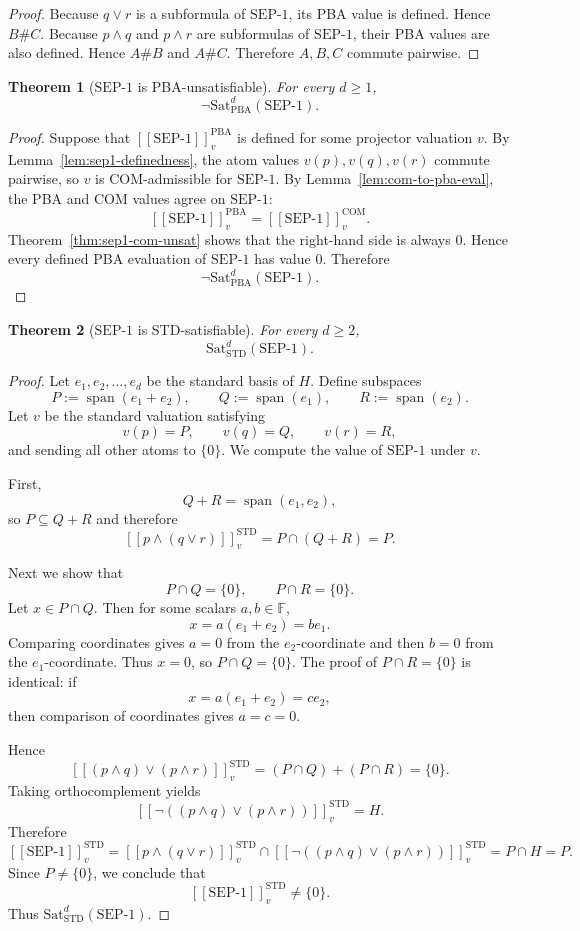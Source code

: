 \documentclass[11pt]{article}
\theoremstyle{plain}
\newtheorem{theorem}{Theorem}[section]
\theoremstyle{definition}
\newcommand{\STD}{\mathrm{STD}}
\newcommand{\COM}{\mathrm{COM}}
\newcommand{\PBA}{\mathrm{PBA}}
\newcommand{\Sat}{\mathrm{Sat}}
\newcommand{\SEPone}{\mathrm{SEP}\text{-}1}
\newcommand{\sem}[1]{\left[\!\left[#1\right]\!\right]}
\newcommand{\field}{\mathbb{F}}
\begin{document}
\begin{proof}
Because $q\vee r$ is a subformula of $\SEPone$, its PBA value is defined.
Hence $B\# C$.
Because $p\wedge q$ and $p\wedge r$ are subformulas of $\SEPone$, their PBA values are also defined.
Hence $A\# B$ and $A\# C$.
Therefore $A,B,C$ commute pairwise.
\end{proof}

\begin{theorem}[\(\SEPone\) is PBA-unsatisfiable]\label{thm:sep1-pba-unsat}
For every $d\geq 1$,
\[
\neg\Sat_{\PBA}^d(\SEPone).
\]
\end{theorem}

\begin{proof}
Suppose that $\sem{\SEPone}^{\PBA}_v$ is defined for some projector valuation $v$.
By Lemma~\ref{lem:sep1-definedness}, the atom values $v(p),v(q),v(r)$ commute pairwise, so $v$ is COM-admissible for $\SEPone$.
By Lemma~\ref{lem:com-to-pba-eval}, the PBA and COM values agree on $\SEPone$:
\[
\sem{\SEPone}^{\PBA}_v = \sem{\SEPone}^{\COM}_v.
\]
Theorem~\ref{thm:sep1-com-unsat} shows that the right-hand side is always $0$.
Hence every defined PBA evaluation of $\SEPone$ has value $0$.
Therefore
\[
\neg\Sat_{\PBA}^d(\SEPone).
\]
\end{proof}

\begin{theorem}[\(\SEPone\) is STD-satisfiable]\label{thm:sep1-std-sat}
For every $d\geq 2$,
\[
\Sat_{\STD}^d(\SEPone).
\]
\end{theorem}

\begin{proof}
Let $e_1,e_2,\dots,e_d$ be the standard basis of $H$.
Define subspaces
\[
P:=\operatorname{span}(e_1+e_2),
\qquad
Q:=\operatorname{span}(e_1),
\qquad
R:=\operatorname{span}(e_2).
\]
Let $v$ be the standard valuation satisfying
\[
 v(p)=P,
 \qquad
 v(q)=Q,
 \qquad
 v(r)=R,
\]
and sending all other atoms to $\{0\}$.
We compute the value of $\SEPone$ under $v$.

First,
\[
Q+R = \operatorname{span}(e_1,e_2),
\]
so $P\subseteq Q+R$ and therefore
\[
\sem{p\wedge(q\vee r)}^{\STD}_v = P\cap(Q+R)=P.
\]

Next we show that
\[
P\cap Q = \{0\},
\qquad
P\cap R = \{0\}.
\]
Let $x\in P\cap Q$.
Then for some scalars $a,b\in\field$,
\[
 x=a(e_1+e_2)=be_1.
\]
Comparing coordinates gives $a=0$ from the $e_2$-coordinate and then $b=0$ from the $e_1$-coordinate.
Thus $x=0$, so $P\cap Q=\{0\}$.
The proof of $P\cap R=\{0\}$ is identical: if
\[
 x=a(e_1+e_2)=ce_2,
\]
then comparison of coordinates gives $a=c=0$.

Hence
\[
\sem{(p\wedge q)\vee(p\wedge r)}^{\STD}_v
=
(P\cap Q)+(P\cap R)
=
\{0\}.
\]
Taking orthocomplement yields
\[
\sem{\neg((p\wedge q)\vee(p\wedge r))}^{\STD}_v = H.
\]
Therefore
\[
\sem{\SEPone}^{\STD}_v
=
\sem{p\wedge(q\vee r)}^{\STD}_v \cap \sem{\neg((p\wedge q)\vee(p\wedge r))}^{\STD}_v
=
P\cap H = P.
\]
Since $P\neq\{0\}$, we conclude that
\[
\sem{\SEPone}^{\STD}_v\neq\{0\}.
\]
Thus $\Sat_{\STD}^d(\SEPone)$.
\end{proof}
\end{document}
